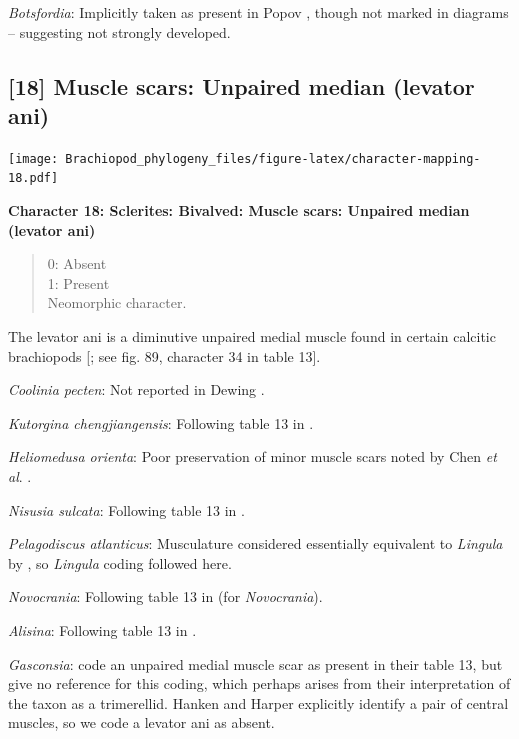 \documentclass[]{book}
\theoremstyle{definition}
\theoremstyle{definition}
\theoremstyle{definition}
\theoremstyle{remark}
\begin{document}
\emph{Botsfordia}: Implicitly taken as present in Popov
\citeyearpar{Popov1992TheCambrian}, though not marked in diagrams --
suggesting not strongly developed.

\hypertarget{muscle-scars-unpaired-median-levator-ani}{%
\subsection*{{[}18{]} Muscle scars: Unpaired median (levator
ani)}\label{muscle-scars-unpaired-median-levator-ani}}

\texttt{[image: Brachiopod\_phylogeny\_files/figure-latex/character-mapping-18.pdf]}

\textbf{Character 18: Sclerites: Bivalved: Muscle scars: Unpaired median
(levator ani)}

\begin{quote}
0: Absent\\
1: Present\\
Neomorphic character.
\end{quote}

The levator ani is a diminutive unpaired medial muscle found in certain
calcitic brachiopods {[}\citet{Williams2000BrachiopodaLinguliformea};
see fig. 89, character 34 in table 13{]}.

\emph{Coolinia pecten}: Not reported in Dewing
\citeyearpar{Dewing2001Hingemodifications}.

\emph{Kutorgina chengjiangensis}: Following table 13 in
\citet{Williams2000BrachiopodaLinguliformea}.

\emph{Heliomedusa orienta}: Poor preservation of minor muscle scars
noted by Chen \emph{et al}. \citeyearpar{Chen2007Reinterpretationof}.

\emph{Nisusia sulcata}: Following table 13 in
\citet{Williams2000BrachiopodaLinguliformea}.

\emph{Pelagodiscus atlanticus}: Musculature considered essentially
equivalent to \emph{Lingula} by
\citet{Williams2000BrachiopodaLinguliformea}, so \emph{Lingula} coding
followed here.

\emph{Novocrania}: Following table 13 in
\citet{Williams2000BrachiopodaLinguliformea} (for \emph{Novocrania}).

\emph{Alisina}: Following table 13 in
\citet{Williams2000BrachiopodaLinguliformea}.

\emph{Gasconsia}: \citet{Williams2000BrachiopodaLinguliformea} code an
unpaired medial muscle scar as present in their table 13, but give no
reference for this coding, which perhaps arises from their
interpretation of the taxon as a trimerellid. Hanken and Harper
\citeyearpar[p.~249 and text-fig. 2]{Hanken1985Thetaxonomy} explicitly
identify a pair of central muscles, so we code a levator ani as absent.
\end{document}
